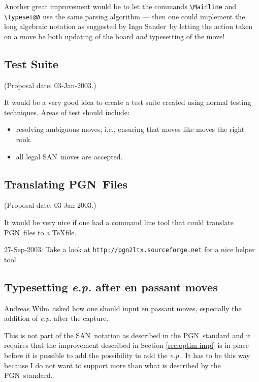 \documentclass[11pt,twocolumn]{article}
\newcommand{\pgn}{PGN\ }
\newcommand{\san}{SAN\ }
\newcommand{\Ingo}{Ingo Sander\ }
\newcommand{\Andreas}{Andreas Wilm\ }
\begin{document}
Another great improvement would be to let the commands
\verb|\Mainline| and \verb|\typeset@A| use the same parsing algorithm
--- then one could implement the long algebraic notation as suggested
by \Ingo by letting the action taken on a move be both updating of the
board \emph{and} typesetting of the move!

\subsection{Test Suite}
\label{sec:test-suite}

(Proposal date: 03-Jan-2003.)

It would be a very good idea to create a test suite created using
normal testing techniques. 
Areas of test should include:
\begin{itemize}
\item resolving ambiguous moves, i.e., ensuring that moves like
   moves the right rook.
\item all legal \san moves are accepted.
\end{itemize}



\subsection{Translating \pgn Files}
\label{sec:transl-pgn-files}

(Proposal date: 03-Jan-2003.)

It would be very nice if one had a command line tool that could
translate \pgn files to a \TeX file.

27-Sep-2003: Take a look at \texttt{http://pgn2ltx.sourceforge.net} for a nice
helper tool.


\subsection{Typesetting \textsl{e.p.} after en passant moves}
\label{sec:typeset-en-passant}

\Andreas asked how one should input en passant moves, especially the addition
of \textsl{e.p.} after the capture. 

This is not part of the \san notation as described in the \pgn standard and it
requires that the improvement described in Section \ref{sec:optim-impl} is in
place before it is possible to add the possibility to add the
\textsl{e.p.}. It has to be this way because I do not want to support more
than what is described by the \pgn standard.
\end{document}
